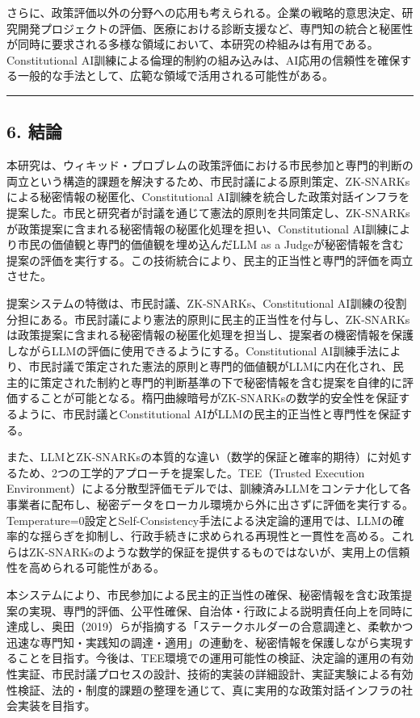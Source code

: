 さらに、政策評価以外の分野への応用も考えられる。企業の戦略的意思決定、研究開発プロジェクトの評価、医療における診断支援など、専門知の統合と秘匿性が同時に要求される多様な領域において、本研究の枠組みは有用である。Constitutional AI訓練による倫理的制約の組み込みは、AI応用の信頼性を確保する一般的な手法として、広範な領域で活用される可能性がある。

\begin{center}\rule{0.5\linewidth}{0.5pt}\end{center}

\subsection{6. 結論}\label{ux7d50ux8ad6}

本研究は、ウィキッド・プロブレムの政策評価における市民参加と専門的判断の両立という構造的課題を解決するため、市民討議による原則策定、ZK-SNARKsによる秘密情報の秘匿化、Constitutional AI訓練を統合した政策対話インフラを提案した。市民と研究者が討議を通じて憲法的原則を共同策定し、ZK-SNARKsが政策提案に含まれる秘密情報の秘匿化処理を担い、Constitutional AI訓練により市民の価値観と専門的価値観を埋め込んだLLM as a Judgeが秘密情報を含む提案の評価を実行する。この技術統合により、民主的正当性と専門的評価を両立させた。

提案システムの特徴は、市民討議、ZK-SNARKs、Constitutional AI訓練の役割分担にある。市民討議により憲法的原則に民主的正当性を付与し、ZK-SNARKsは政策提案に含まれる秘密情報の秘匿化処理を担当し、提案者の機密情報を保護しながらLLMの評価に使用できるようにする。Constitutional AI訓練手法により、市民討議で策定された憲法的原則と専門的価値観がLLMに内在化され、民主的に策定された制約と専門的判断基準の下で秘密情報を含む提案を自律的に評価することが可能となる。楕円曲線暗号がZK-SNARKsの数学的安全性を保証するように、市民討議とConstitutional AIがLLMの民主的正当性と専門性を保証する。

また、LLMとZK-SNARKsの本質的な違い（数学的保証と確率的期待）に対処するため、2つの工学的アプローチを提案した。TEE（Trusted Execution Environment）による分散型評価モデルでは、訓練済みLLMをコンテナ化して各事業者に配布し、秘密データをローカル環境から外に出さずに評価を実行する。Temperature=0設定とSelf-Consistency手法による決定論的運用では、LLMの確率的な揺らぎを抑制し、行政手続きに求められる再現性と一貫性を高める。これらはZK-SNARKsのような数学的保証を提供するものではないが、実用上の信頼性を高められる可能性がある。

本システムにより、市民参加による民主的正当性の確保、秘密情報を含む政策提案の実現、専門的評価、公平性確保、自治体・行政による説明責任向上を同時に達成し、奥田（2019）らが指摘する「ステークホルダーの合意調達と、柔軟かつ迅速な専門知・実践知の調達・適用」の連動を、秘密情報を保護しながら実現することを目指す。今後は、TEE環境での運用可能性の検証、決定論的運用の有効性実証、市民討議プロセスの設計、技術的実装の詳細設計、実証実験による有効性検証、法的・制度的課題の整理を通じて、真に実用的な政策対話インフラの社会実装を目指す。

